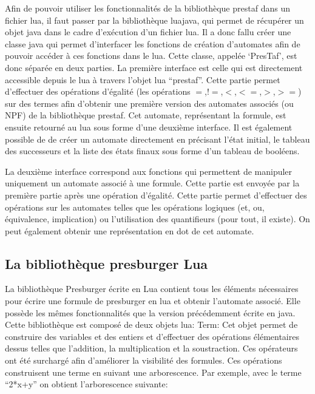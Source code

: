 Afin de pouvoir utiliser les fonctionnalités de la bibliothèque prestaf dans un fichier lua, il faut passer par la bibliothèque luajava, qui permet de récupérer un objet java dans le cadre d’exécution d’un fichier lua. Il a donc fallu créer une classe java qui permet d’interfacer les fonctions de création d’automates afin de pouvoir accéder à ces fonctions dans le lua. Cette classe, appelée ‘PresTaf’, est donc séparée en deux parties. 
La première interface est celle qui est directement accessible depuis le lua à travers l’objet lua “prestaf”. Cette partie permet d’effectuer des opérations d’égalité (les opérations $=$,$!=$,$<$,$<=$,$>$,$>=$) sur des termes afin d’obtenir une première version des automates associés (ou NPF) de la bibliothèque prestaf. Cet automate, représentant la formule, est ensuite retourné au lua sous forme d’une deuxième interface. Il est également possible de de créer un automate directement en précisant l’état initial, le tableau des successeurs et la liste des états finaux sous forme d’un tableau de booléens.

La deuxième interface correspond aux fonctions qui permettent de manipuler uniquement un automate associé à une formule. Cette partie est envoyée par la première partie après une opération d’égalité. Cette partie permet d’effectuer des opérations sur les automates telles que les opérations logiques (et, ou, équivalence, implication) ou l’utilisation des quantifieurs (pour tout, il existe). On peut également obtenir une représentation en dot de cet automate.

\subsection{La bibliothèque presburger Lua}

La bibliothèque Presburger écrite en Lua contient tous les éléments nécessaires pour écrire une formule de presburger en lua et obtenir l’automate associé. Elle possède les mêmes fonctionnalités que la version précédemment écrite en java. Cette bibliothèque est composé de deux objets lua:
Term: Cet objet permet de construire des variables et des entiers et d’effectuer des opérations élémentaires dessus telles que l’addition, la multiplication et la soustraction. Ces opérateurs ont été surchargé afin d’améliorer la visibilité des formules. Ces opérations construisent une terme en suivant une arborescence. Par exemple, avec le terme “2*x+y” on obtient l’arborescence suivante:

